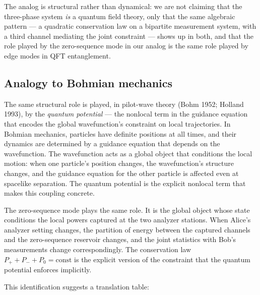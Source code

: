 \documentclass[
  11pt]{article}
\begin{document}
The analog is structural rather than dynamical: we are not claiming that
the three-phase system \emph{is} a quantum field theory, only that the
same algebraic pattern --- a quadratic conservation law on a bipartite
measurement system, with a third channel mediating the joint constraint
--- shows up in both, and that the role played by the zero-sequence mode
in our analog is the same role played by edge modes in QFT entanglement.

\subsection{Analogy to Bohmian
mechanics}\label{analogy-to-bohmian-mechanics}

The same structural role is played, in pilot-wave theory (Bohm 1952;
Holland 1993), by the \emph{quantum potential} --- the nonlocal term in
the guidance equation that encodes the global wavefunction's constraint
on local trajectories. In Bohmian mechanics, particles have definite
positions at all times, and their dynamics are determined by a guidance
equation that depends on the wavefunction. The wavefunction acts as a
global object that conditions the local motion: when one particle's
position changes, the wavefunction's structure changes, and the guidance
equation for the other particle is affected even at spacelike
separation. The quantum potential is the explicit nonlocal term that
makes this coupling concrete.

The zero-sequence mode plays the same role. It is the global object
whose state conditions the local powers captured at the two analyzer
stations. When Alice's analyzer setting changes, the partition of energy
between the captured channels and the zero-sequence reservoir changes,
and the joint statistics with Bob's measurements change correspondingly.
The conservation law \(P_+ + P_- + P_0 = \mathrm{const}\) is the
explicit version of the constraint that the quantum potential enforces
implicitly.

This identification suggests a translation table:
\end{document}

